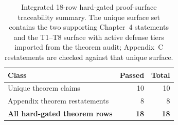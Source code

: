\begin{table}[htbp]
\centering
\caption{Integrated 18-row hard-gated proof-surface traceability summary. The unique surface set
contains the two supporting Chapter~4 statements and the T1--T8 surface with
active defense tiers imported from the theorem audit; Appendix~C restatements
are checked against that unique surface.}
\label{tab:integrated-theorem-gate-summary}
\begin{tabular}{lrr}
\toprule
Class & Passed & Total \\
\midrule
Unique theorem claims & 10 & 10 \\
Appendix theorem restatements & 8 & 8 \\
\midrule
\textbf{All hard-gated theorem rows} & \textbf{18} & \textbf{18} \\
\bottomrule
\end{tabular}
\end{table}
